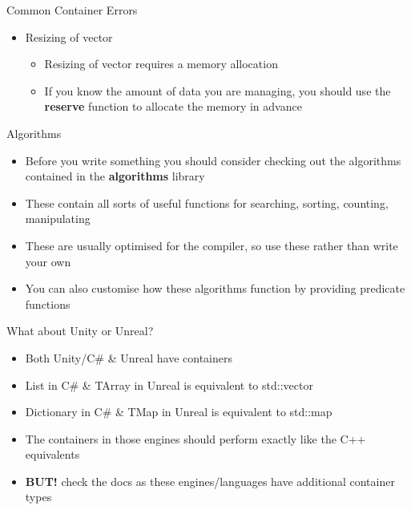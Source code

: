 \begin{frame}{Common Container Errors}
\begin{itemize}
	\pause \item Resizing of vector
	\begin{itemize}
		\pause \item Resizing of vector requires a memory allocation
		\pause \item If you know the amount of data you are managing, you should use the \textbf{reserve} function to allocate the memory in advance
	\end{itemize}
\end{itemize}
\end{frame}

\begin{frame}{Algorithms}
	\begin{itemize}
		\pause \item Before you write something you should consider checking out the algorithms contained in the \textbf{algorithms} library
		\pause \item These contain all sorts of useful functions for searching, sorting, counting, manipulating
		\pause \item These are usually optimised for the compiler, so use these rather than write your own
		\pause \item You can also customise how these algorithms function by providing predicate functions 
	\end{itemize}
\end{frame}

\begin{frame}{What about Unity or Unreal?}
	\begin{itemize}
		\pause \item Both Unity/C\# \& Unreal have containers
		\pause \item List in C\# \& TArray in Unreal is equivalent to std::vector
		\pause \item Dictionary in C\# \& TMap in Unreal is equivalent to std::map
		\pause \item The containers in those engines should perform exactly like the C++ equivalents
		\pause \item \textbf{BUT!} check the docs as these engines/languages have additional container types
	\end{itemize}
\end{frame}